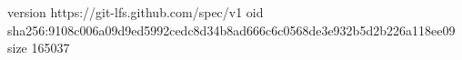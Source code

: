 version https://git-lfs.github.com/spec/v1
oid sha256:9108c006a09d9ed5992cedc8d34b8ad666c6c0568de3e932b5d2b226a118ee09
size 165037
